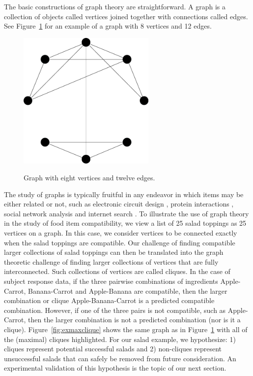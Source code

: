 The basic constructions of graph theory are straightforward.  A graph is a collection of objects called vertices \citep{Bollobaas1998} joined together with connections called edges.  See Figure~\ref{fig:exgraph} for an example of a graph with 8 vertices and 12 edges.  

\begin{figure}[h!]
\caption[Example graph.]{Graph with eight vertices and twelve edges.}
\centering
\includegraphics[width=0.6\textwidth]{./img/basic_graph.png}
\label{fig:exgraph}
\end{figure}

The study of graphs is typically fruitful in any endeavor in which items may be either related or not, such as electronic circuit design \citep{Bollobaas1998},  protein interactions \citep{Palla2005}, social network analysis \citep{Knoke2008} and internet search \citep{Brin1998}.  To illustrate the use of graph theory in the study of food item compatibility, we view a list of 25 salad toppings as 25 vertices on a graph.  In this case, we consider vertices to be connected exactly when the salad toppings are compatible.  Our challenge of finding compatible larger collections of salad toppings can then be translated into the graph theoretic challenge of finding larger collections of vertices that are fully interconnected.  Such collections of vertices are called cliques.  In the case of subject response data, if the three pairwise combinations of ingredients Apple-Carrot, Banana-Carrot and Apple-Banana are compatible, then the larger combination or clique Apple-Banana-Carrot is a predicted compatible combination.  However, if one of the three pairs is not compatible, such as Apple-Carrot, then the larger combination is not a predicted combination (nor is it a clique).  Figure~\ref{fig:exmaxclique} shows the same graph as in Figure~\ref{fig:exgraph} with all of the (maximal) cliques highlighted.  For our salad example, we hypothesize: 1) cliques represent potential successful salads and 2) non-cliques represent unsuccessful salads that can safely be removed from future consideration.  An experimental validation of this hypothesis is the topic of our next section.  

